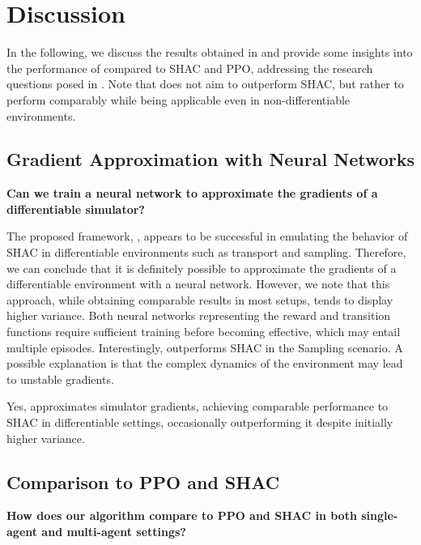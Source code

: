 \section{Discussion}
In the following, we discuss the results obtained in  and provide some insights into the performance of \fname{} compared to SHAC and PPO, addressing the research questions posed in . Note that \fname{} does not aim to outperform SHAC, but rather to perform comparably while being applicable even in non-differentiable environments.

\subsection{Gradient Approximation with Neural Networks}
\begin{rqbox}
\textbf{Can we train a neural network to approximate the gradients of a differentiable simulator?}
\end{rqbox}

The proposed framework, \fname{}, appears to be successful in emulating the behavior of SHAC in differentiable environments such as transport and sampling. Therefore, we can conclude that it is definitely possible to approximate the gradients of a differentiable environment with a neural network. However, we note that this approach, while obtaining comparable results in most setups, tends to display higher variance. Both neural networks representing the reward and transition functions require sufficient training before becoming effective, which may entail multiple episodes. Interestingly, \fname{} outperforms SHAC in the Sampling scenario. A possible explanation is that the complex dynamics of the environment may lead to unstable gradients.

\begin{replybox}
Yes, \fname{} approximates simulator gradients, achieving comparable performance to SHAC in differentiable settings, occasionally outperforming it despite initially higher variance.
\end{replybox}

\subsection{Comparison to PPO and SHAC}
\begin{rqbox}
\textbf{How does our algorithm compare to PPO and SHAC in both single-agent and multi-agent settings?}
\end{rqbox}

